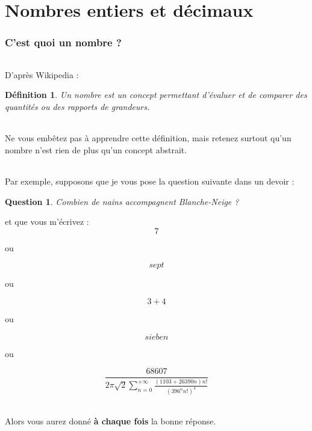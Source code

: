 \documentclass[12pt]{article}
\newtheorem{definition}{Définition}
\newtheorem*{question}{Question}
\begin{document}
\part*{Nombres entiers et décimaux}
\section{C'est quoi un nombre ?}

\paragraph{}
D'après Wikipedia :

\begin{definition}
    Un nombre est un concept permettant d’évaluer et de comparer des quantités ou des rapports de grandeurs.
\end{definition}

\paragraph{}
Ne vous embêtez pas à apprendre cette définition, mais retenez surtout qu'un nombre n'est rien de plus qu'un concept abstrait.

\paragraph{}
Par exemple, supposons que je vous pose la question suivante dans un devoir :

\begin{question}
  Combien de nains accompagnent Blanche-Neige ?
\end{question}

et que vous m'écrivez :
$$7$$

ou

$$sept$$

ou

$$3+4$$

ou

$$sieben$$

ou

$$\frac{68607}{2 \pi \sqrt{2} \sum_{n = 0}^{+ \infty}\frac{(1103 + 26390n)n!}{(396^{n}n!)^{4}}}$$

\paragraph{}
Alors vous aurez donné \textbf{à chaque fois} la bonne réponse.
\end{document}
